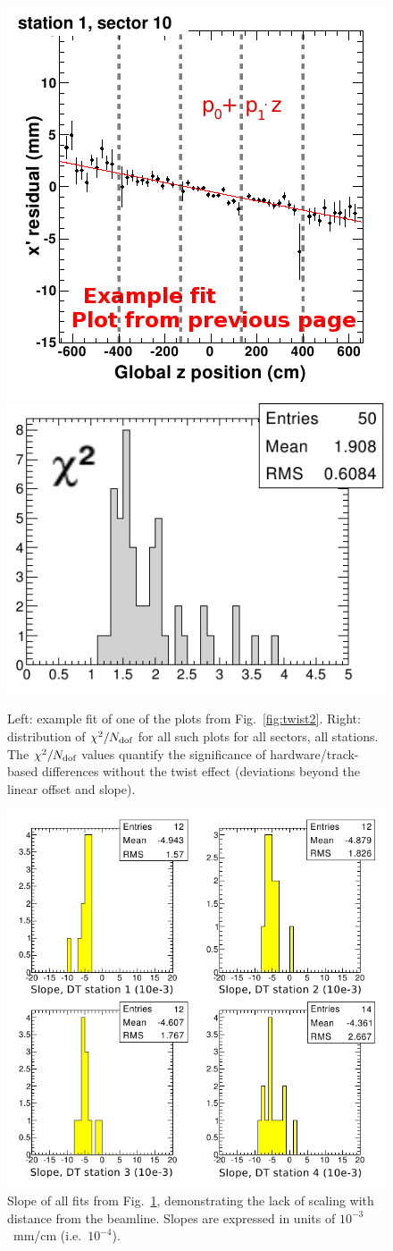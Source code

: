 \documentclass[12pt]{article}
\newcommand{\s}[1]{{\mbox{\scriptsize #1}}}
\begin{document}
\begin{figure}
\begin{center}
\includegraphics[height=5 cm]{growth_with_station2.png} \hspace{0.5 cm}
\includegraphics[height=5 cm]{growth_with_station_chi2.png}
\end{center}
\caption{Left: example fit of one of the plots from
  Fig.~\ref{fig:twist2}.  Right: distribution of $\chi^2/N_\s{dof}$
  for all such plots for all sectors, all
  stations.  The $\chi^2/N_\s{dof}$ values quantify the significance
  of hardware/track-based differences without the twist effect
  (deviations beyond the linear offset and slope). \label{fig:growth_with_station}}
\end{figure}

\begin{figure}
\begin{center}
\includegraphics[width=0.75\linewidth]{growth_with_station3.png}
\end{center}
\caption{Slope of all fits from Fig.~\ref{fig:growth_with_station},
  demonstrating the lack of scaling with distance from the beamline.
  Slopes are expressed in units of $10^{-3}$~mm/cm
  (i.e.~$10^{-4}$). \label{fig:growth_with_station2}}
\end{figure}
\end{document}
